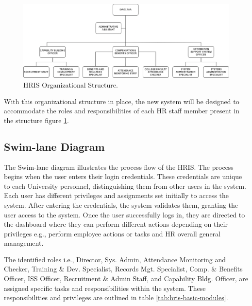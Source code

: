 \begin{figure}[H]
    \centering
    \includegraphics[width=1\linewidth]{figures/images/doc/organizational-structure.png}
    \caption{HRIS Organizational Structure.}
    \label{fig:organizational-struct}
\end{figure}

With this organizational structure in place, the new system will be designed to accommodate the roles and responsibilities of each HR staff member present in the structure figure \ref*{fig:organizational-struct}. 

    \subsection{Swim-lane Diagram}
    The Swim-lane diagram illustrates the process flow of the HRIS. The process begins when the user enters their login credentials. These credentials are unique to each University personnel, distinguishing them from other users in the system. Each user has different privileges and assignments set initially to access the system. After entering the credentials, the system validates them, granting the user access to the system. Once the user successfully logs in, they are directed to the dashboard where they can perform different actions depending on their privileges e.g., perform employee actions or tasks and HR overall general management.

    The identified roles i.e., Director, Sys. Admin, Attendance Monitoring and Checker, Training \& Dev. Specialist, Records Mgt. Specialist, Comp. \& Benefits Officer, ISS Officer, Recruitment \& Admin Staff, and Capability Bldg. Officer, are assigned specific tasks and responsibilities within the system. These responsibilities and privileges are outlined in table \ref*{tab:hris-basic-modules}. 

